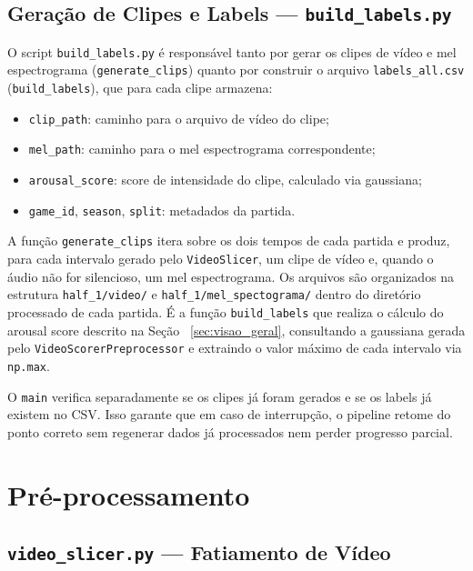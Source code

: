 \documentclass[12pt, a4paper]{article}
\begin{document}
\subsection{Geração de Clipes e Labels  — \texttt{build\_labels.py}}

O script \texttt{build\_labels.py} é responsável tanto por gerar os clipes de vídeo e mel espectrograma (\texttt{generate\_clips}) quanto por construir o arquivo \texttt{labels\_all.csv} (\texttt{build\_labels}), que para cada clipe armazena:

\begin{itemize}
    \item \texttt{clip\_path}: caminho para o arquivo de vídeo do clipe;
    \item \texttt{mel\_path}: caminho para o mel espectrograma correspondente;
    \item \texttt{arousal\_score}: score de intensidade do clipe, calculado via gaussiana;
    \item \texttt{game\_id}, \texttt{season}, \texttt{split}: metadados da partida.
\end{itemize}

A função \texttt{generate\_clips} itera sobre os dois tempos de cada partida e produz, para cada intervalo gerado pelo \texttt{VideoSlicer}, um clipe de vídeo e, quando o áudio não for silencioso, um mel espectrograma. Os arquivos são organizados na estrutura \texttt{half\_1/video/} e \texttt{half\_1/mel\_spectograma/} dentro do diretório processado de cada partida. É a função \texttt{build\_labels} que realiza o cálculo do arousal score descrito na Seção ~\ref{sec:visao_geral}, consultando a gaussiana gerada pelo \texttt{VideoScorerPreprocessor} e extraindo o valor máximo de cada intervalo via \texttt{np.max}.

O \texttt{main} verifica separadamente se os clipes já foram gerados e se os labels já existem no CSV. Isso garante que em caso de interrupção, o pipeline retome do ponto correto sem regenerar dados já processados nem perder progresso parcial.

\section{Pré-processamento}

\subsection{\texttt{video\_slicer.py} — Fatiamento de Vídeo}
\end{document}

